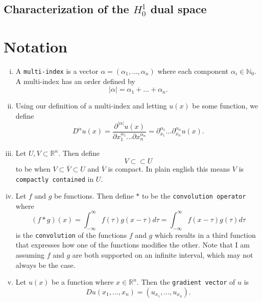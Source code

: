 \documentclass[11pt]{article}
\theoremstyle{definition}
\begin{document}
\newpage

\subsection{Characterization of the $H_0^1$ dual space}

\newpage

\section*{Notation}
%
\begin{enumerate}[(i)]
	\item A \texttt{multi-index} is a vector $\alpha = (\alpha_1, \dots, \alpha_n)$ where each component $\alpha_i \in \mathbb{N}_0$.
A multi-index has an order defined by
\[|\alpha| = \alpha_1 + \dots + \alpha_n.\]

\item Using our definition of a multi-index and letting $u(x)$ be some function, we define
\[D^{\alpha}u(x) = \frac{\partial^{|\alpha|}u(x)}{\partial x_1^{\alpha_1} \dots \partial x_n^{\alpha_n}} = \partial_{x_1}^{\alpha_1}\dots\partial_{x_n}^{\alpha_n}u(x).\]

\item Let $U,V \subset \mathbb{R}^n$. Then define
\[V \subset\subset U\]
to be when $V \subset \overline{V} \subset U$ and $\overline{V}$ is compact. In plain english this means $V$ is \texttt{compactly contained} in $U$.

\item Let $f$ and $g$ be functions. Then define $*$ to be the \texttt{convolution operator} where
\[(f*g)(x) = \int_{-\infty}^{\infty}{f(\tau)g(x - \tau)d\tau} = \int_{-\infty}^{\infty}{f(x - \tau)g(\tau)d\tau}\]
is the \texttt{convolution} of the functions $f$ and $g$ which results in a third function that expresses
how one of the functions modifies the other. Note that I am assuming $f$ and $g$ are both supported on an
infinite interval, which may not always be the case.

\item Let $u(x)$ be a function where $x \in \mathbb{R}^n$. Then the \texttt{gradient vector} of $u$ is 
	\[Du(x_1,\dots,x_n) = (u_{x_1},...,u_{x_n}).\]
\end{enumerate}

\newpage



\end{document}
